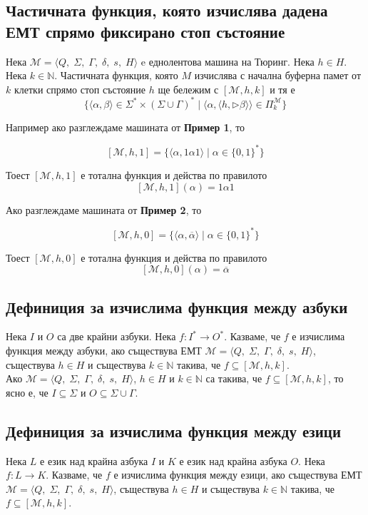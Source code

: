 \documentclass[14pt]{extarticle}
\begin{document}
\subsection*{Частичната функция, която изчислява дадена ЕМТ спрямо фиксирано стоп състояние}
Нека \(\mathcal M = \langle Q,\; \Sigma,\; \Gamma,\; \delta,\; s,\; H \rangle\) e еднолентова машина на Тюринг.
Нека \(h \in H\). Нека \(k \in \mathbb N\). Частичната функция, която \(M\) изчислява с начална буферна памет от \(k\) клетки спрямо стоп състояние \(h\) ще бележим с \([\mathcal M, h, k]\) и тя е 
\[\{ \langle \alpha, \beta \rangle \in \Sigma^* \times (\Sigma \cup \Gamma)^* \mid \langle \alpha, \langle h, \triangleright\beta \rangle \rangle \in \Pi_k^{\mathcal M}  \}\]

Например ако разглеждаме машината от \textbf{Пример 1}, то

\[[\mathcal M, h, 1] = \{ \langle \alpha, 1 \alpha 1 \rangle \mid \alpha \in \{0, 1\}^*  \} \]

Тоест \([\mathcal M, h, 1]\) е тотална функция и действа по правилото
\[ [\mathcal M, h, 1](\alpha) = 1\alpha1 \]

Ако разглеждаме машината от \textbf{Пример 2}, то

\[[\mathcal M, h, 0] = \{ \langle \alpha, \overline{\alpha} \rangle \mid \alpha \in \{0, 1\}^*  \} \]

Тоест \([\mathcal M, h, 0]\) е тотална функция и действа по правилото
\[ [\mathcal M, h, 0](\alpha) = \overline{\alpha} \]

\subsection*{Дефиниция за изчислима функция между азбуки}
Нека \(I\) и \(O\) са две крайни азбуки.
Нека \(f : I^* \to O^*\). 
Казваме, че \(f\) е изчислима функция между азбуки, ако
съществува ЕМТ \(\mathcal M = \langle Q,\; \Sigma,\; \Gamma,\; \delta,\; s,\; H \rangle\),
съществува \(h \in H\) и съществува \(k \in \mathbb N\) такива, че \(f \subseteq [\mathcal M, h, k]\). \\

Ако \(\mathcal M = \langle Q,\; \Sigma,\; \Gamma,\; \delta,\; s,\; H \rangle\), \(h \in H\) и \(k \in \mathbb N\)
са такива, че \(f \subseteq [\mathcal M, h, k]\), то ясно е, че \(I \subseteq \Sigma\) и \(O \subseteq \Sigma \cup \Gamma\).

\subsection*{Дефиниция за изчислима функция между езици}
Нека \(L\) е език над крайна азбука \(I\) и \(K\) е език над крайна азбука \(O\).
Нека \(f : L \to K\). Казваме, че \(f\) е изчислима функция между езици, ако
съществува ЕМТ \(\mathcal M = \langle Q,\; \Sigma,\; \Gamma,\; \delta,\; s,\; H \rangle\),
съществува \(h \in H\) и съществува \(k \in \mathbb N\) такива, че \(f \subseteq [\mathcal M, h, k]\).
\end{document}
